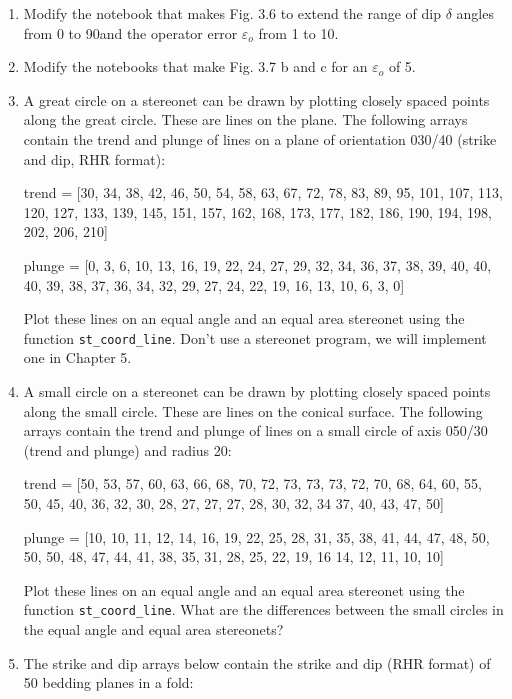 \documentclass[a4paper , 12pt]{book}
\newcommand{\code}[1]{\colorbox{light-gray}{\texttt{#1}}}
\begin{document}
\begin{enumerate}
  \item Modify the notebook that makes Fig. 3.6 to extend the range of dip $\delta$ angles from 0 to 90\degree\space and the operator error $\varepsilon_o$ from 1 to 10\degree.
  
  \item Modify the notebooks that make Fig. 3.7 b and c for an $\varepsilon_o$ of 5\degree.
  
  \item A great circle on a stereonet can be drawn by plotting closely spaced points along the great circle. These are lines on the plane. The following arrays contain the trend and plunge of lines on a plane of orientation 030/40 (strike and dip, RHR format):
  
  trend = [30, 34, 38, 42, 46, 50, 54, 58, 63, 67, 72, 78, 83, 89, 95, 101, 107, 113, 120, 127, 133, 139, 145, 151, 157, 162, 168, 173, 177, 182, 186, 190, 194, 198, 202, 206, 210]
  
  plunge = [0, 3, 6, 10, 13, 16, 19, 22, 24, 27, 29, 32, 34, 36, 37, 38, 39, 40, 40, 40, 39, 38, 37, 36, 34, 32, 29, 27, 24, 22, 19, 16, 13, 10, 6, 3, 0]
  
  Plot these lines on an equal angle and an equal area stereonet using the function \code{st\_coord\_line}. Don't use a stereonet program, we will implement one in Chapter 5.
  
  \item A small circle on a stereonet can be drawn by plotting closely spaced points along the small circle. These are lines on the conical surface. The following arrays contain the trend and plunge of lines on a small circle of axis 050/30 (trend and plunge) and radius 20\degree:
  
  trend = [50, 53, 57, 60, 63, 66, 68, 70, 72, 73, 73, 73, 72, 70, 68, 64, 60, 55, 50, 45, 40, 36, 32, 30, 28, 27, 27, 27, 28, 30, 32, 34 37, 40, 43, 47, 50]
  
  plunge = [10, 10, 11, 12, 14, 16, 19, 22, 25, 28, 31, 35, 38, 41, 44, 47, 48, 50, 50, 50, 48, 47, 44, 41, 38, 35, 31, 28, 25, 22, 19, 16 14, 12, 11, 10, 10]
  
  Plot these lines on an equal angle and an equal area stereonet using the function \code{st\_coord\_line}. What are the differences between the small circles in the equal angle and equal area stereonets? 
  
  \item The strike and dip arrays below contain the strike and dip (RHR format) of 50 bedding planes in a fold:
  

\end{enumerate}
\end{document}
